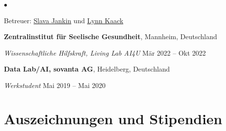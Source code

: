 \documentclass[margin,line, 10pt]{res}
\newenvironment{list2}{
	\begin{list}{$\bullet$}{%
			\setlength{\itemsep}{0in}
			\setlength{\parsep}{0in} \setlength{\parskip}{0in}
			\setlength{\topsep}{0in} \setlength{\partopsep}{0in} 
			\setlength{\leftmargin}{0.2in}}}{\end{list}}
\begin{document}
\begin{resume}
		\begin{list2}
			\vspace*{-0.3cm}
			\item  Betreuer: \href{https://sjankin.com}{Slava Jankin} und \href{https://lynnkaack.com}{Lynn Kaack}
		\end{list2}
		\vspace{-.3cm}
		
		{\bf Zentralinstitut f\"ur Seelische Gesundheit}, Mannheim, Deutschland
		
		\vspace{-.3cm}
		{\em Wissenschaftliche Hilfskraft, Living Lab AI4U} \hfill {M\"ar 2022 -- Okt 2022}
		
%		
		\vspace{-.3cm}
		{\bf Data Lab/AI, sovanta AG}, Heidelberg, Deutschland
		
		\vspace{-0.3cm}
		{\em Werkstudent} \hfill {Mai 2019 -- Mai 2020}\\
		
		
		
		\section{\sc Auszeichnungen und Stipendien} 
		

\end{resume}
\end{document}
